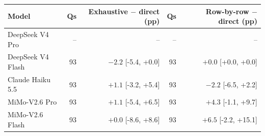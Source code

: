 \begin{tabular}{lrrrr}
\toprule
Model & Qs & Exhaustive $-$ direct (pp) & Qs & Row-by-row $-$ direct (pp) \\
\midrule
DeepSeek V4 Pro & -- & -- & -- & -- \\
DeepSeek V4 Flash & 93 & $-2.2$ [-5.4, +0.0] & 93 & $+0.0$ [+0.0, +0.0] \\
Claude Haiku 5.5 & 93 & $+1.1$ [-3.2, +5.4] & 93 & $-2.2$ [-6.5, +2.2] \\
MiMo-V2.6 Pro & 93 & $+1.1$ [-5.4, +6.5] & 93 & $+4.3$ [-1.1, +9.7] \\
MiMo-V2.6 Flash & 93 & $+0.0$ [-8.6, +8.6] & 93 & $+6.5$ [-2.2, +15.1] \\
\bottomrule
\end{tabular}
